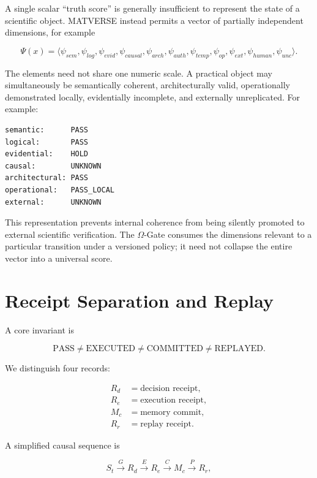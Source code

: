 \documentclass[11pt]{article}
\begin{document}
A single scalar ``truth score'' is generally insufficient to represent the state of a scientific object. MATVERSE instead permits a vector of partially independent dimensions, for example

\begin{equation}
\Psi(x)=\langle \psi_{sem},\psi_{log},\psi_{evid},\psi_{causal},\psi_{arch},\psi_{auth},\psi_{temp},\psi_{op},\psi_{ext},\psi_{human},\psi_{unc}\rangle.
\end{equation}

The elements need not share one numeric scale. A practical object may simultaneously be semantically coherent, architecturally valid, operationally demonstrated locally, evidentially incomplete, and externally unreplicated. For example:

\begin{verbatim}
semantic:      PASS
logical:       PASS
evidential:    HOLD
causal:        UNKNOWN
architectural: PASS
operational:   PASS_LOCAL
external:      UNKNOWN
\end{verbatim}

This representation prevents internal coherence from being silently promoted to external scientific verification. The $\Omega$-Gate consumes the dimensions relevant to a particular transition under a versioned policy; it need not collapse the entire vector into a universal score.

\section{Receipt Separation and Replay}

A core invariant is

\begin{equation}
\mathrm{PASS}\neq\mathrm{EXECUTED}\neq\mathrm{COMMITTED}\neq\mathrm{REPLAYED}.
\end{equation}

We distinguish four records:

\begin{align}
R_d &= \text{decision receipt},\\
R_e &= \text{execution receipt},\\
M_c &= \text{memory commit},\\
R_r &= \text{replay receipt}.
\end{align}

A simplified causal sequence is

\begin{equation}
S_t \xrightarrow{G} R_d \xrightarrow{E} R_e \xrightarrow{C} M_c \xrightarrow{P} R_r,
\end{equation}
\end{document}
